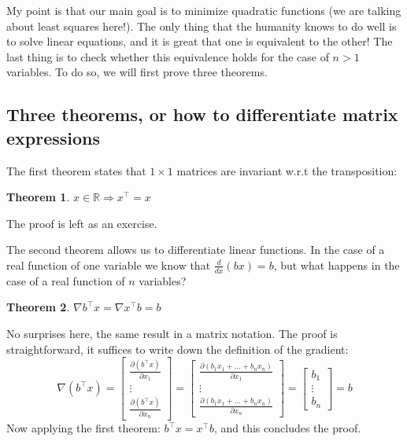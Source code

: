 \documentclass[notitlepage,oneside]{book}
\newtheorem{theorem}{Theorem}
\begin{document}
My point is that our main goal is to minimize quadratic functions (we are talking about least squares here!).
The only thing that the humanity knows to do well is to solve linear equations, and it is great that one is equivalent to the other!
The last thing is to check whether this equivalence holds for the case of $n>1$ variables.
To do so, we will first prove three theorems.

\subsection{Three theorems, or how to differentiate matrix expressions}
The first theorem states that $1\times 1$ matrices are invariant w.r.t the transposition:
\begin{theorem}
$x\in \mathbb R \Rightarrow x^\top = x$
\end{theorem}
The proof is left as an exercise.

The second theorem allows us to differentiate linear functions. In the case of a real function of one variable we know that
$\frac{d}{dx}(bx) = b$, but what happens in the case of a real function of $n$ variables?
\begin{theorem}
$\nabla b^\top x = \nabla x^\top b = b$
\end{theorem}
No surprises here, the same result in a matrix notation. The proof is straightforward, it suffices to write down the definition of the gradient:
$$\nabla(b^\top x) = \begin{bmatrix}\frac{\partial (b^\top x)}{\partial x_1} \\ \vdots \\ \frac{\partial (b^\top x)}{\partial x_n} \end{bmatrix} = \begin{bmatrix}\frac{\partial (b_1 x_1 + \dots + b_n x_n)}{\partial x_1} \\ \vdots \\ \frac{\partial (b_1 x_1 + \dots + b_n x_n)}{\partial x_n} \end{bmatrix}
= \begin{bmatrix}b_1 \\ \vdots \\ b_n \end{bmatrix} = b$$
Now applying the first theorem: $b^\top x = x^\top b$, and this concludes the proof.
\end{document}
